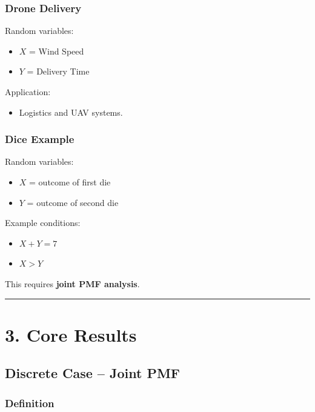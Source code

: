 \documentclass[12pt]{article}
\begin{document}
\subsubsection*{Drone Delivery}

Random variables:

\begin{itemize}
\item $X$ = Wind Speed
\item $Y$ = Delivery Time
\end{itemize}

Application:

\begin{itemize}
\item Logistics and UAV systems.
\end{itemize}

\subsubsection*{Dice Example}

Random variables:

\begin{itemize}
\item $X$ = outcome of first die
\item $Y$ = outcome of second die
\end{itemize}

Example conditions:

\begin{itemize}
\item $X + Y = 7$
\item $X > Y$
\end{itemize}

This requires \textbf{joint PMF analysis}.

\hrule
\vspace{0.5cm}

\section*{3. Core Results}

\subsection*{Discrete Case – Joint PMF}

\subsubsection*{Definition}
\end{document}
